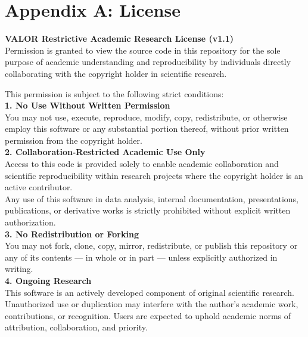 
\section*{Appendix A: License}


\noindent
\textbf{VALOR Restrictive Academic Research License (v1.1)}\\

\noindent
Permission is granted to view the source code in this repository for the sole purpose of academic understanding and reproducibility by individuals directly collaborating with the copyright holder in scientific research.\\

\vspace{0.1cm}

\noindent
This permission is subject to the following strict conditions:\\

\noindent
\textbf{1. No Use Without Written Permission}\\
You may not use, execute, reproduce, modify, copy, redistribute, or otherwise employ this software or any substantial portion thereof, without prior written permission from the copyright holder.\\

\noindent
\textbf{2. Collaboration-Restricted Academic Use Only}\\
Access to this code is provided solely to enable academic collaboration and scientific reproducibility within research projects where the copyright holder is an active contributor.\\
Any use of this software in data analysis, internal documentation, presentations, publications, or derivative works is strictly prohibited without explicit written authorization.\\

\noindent
\textbf{3. No Redistribution or Forking}\\
You may not fork, clone, copy, mirror, redistribute, or publish this repository or any of its contents — in whole or in part — unless explicitly authorized in writing.\\

\noindent
\textbf{4. Ongoing Research}\\
This software is an actively developed component of original scientific research. Unauthorized use or duplication may interfere with the author’s academic work, contributions, or recognition. Users are expected to uphold academic norms of attribution, collaboration, and priority.\\


